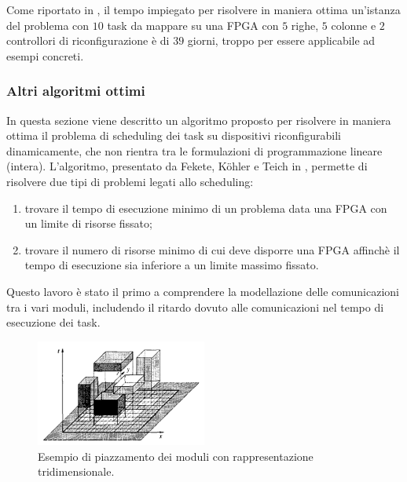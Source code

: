 Come riportato in \cite{Redaelli2DILP}, il tempo impiegato per risolvere in 
maniera ottima un'istanza del problema con $10$ task da mappare su una 
\ac{FPGA} con $5$ righe, $5$ colonne e $2$ controllori di riconfigurazione è di 
$39$ giorni, troppo per essere applicabile ad esempi concreti.


\subsubsection{Altri algoritmi ottimi}
In questa sezione viene descritto un algoritmo proposto per risolvere in 
maniera ottima il problema di scheduling dei task su dispositivi 
riconfigurabili dinamicamente, che non rientra tra le formulazioni di 
programmazione lineare (intera). L'algoritmo, presentato da Fekete, K\"ohler 
e Teich in \cite{FeketeOptimal}, permette di risolvere due tipi di problemi 
legati allo scheduling:
\begin{enumerate}
 \item trovare il tempo di esecuzione minimo di un problema data una \ac{FPGA} 
con un limite di risorse fissato;
 \item trovare il numero di risorse minimo di cui deve disporre una \ac{FPGA} 
affinchè il tempo di esecuzione sia inferiore a un limite massimo fissato.
\end{enumerate}

Questo lavoro è stato il primo a comprendere la modellazione delle 
comunicazioni tra i vari moduli, includendo il ritardo dovuto alle 
comunicazioni nel tempo di esecuzione dei task.

\begin{figure}[!tb]
 \begin{center}
  \includegraphics[width=0.5\textwidth]
{capitoli/figure/cap2/BoxModules.pdf}
\caption[Piazzamento dei moduli con rappresentazione tridimensionale]{Esempio 
di piazzamento dei moduli con rappresentazione tridimensionale\footnotemark.}
\label{fig:boxModules}
 \end{center}
\end{figure}

